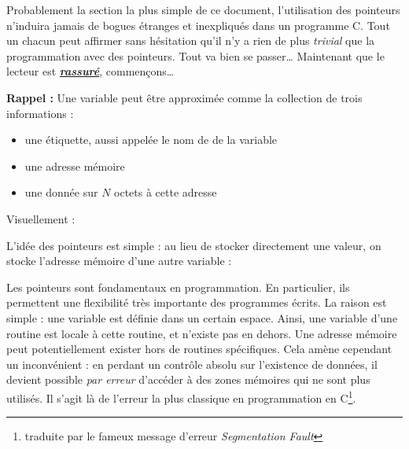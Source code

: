 \documentclass[../../../main.tex]{subfiles}
\begin{document}
Probablement la section la plus simple de ce document, l'utilisation des pointeurs n'induira jamais de bogues étranges et inexpliqués dans un programme C. Tout un chacun peut affirmer sans hésitation qu'il n'y a rien de plus \textit{trivial} que la programmation avec des pointeurs.\newline
Tout va bien se passer\dots\newline
Maintenant que le lecteur est \textbf{\underline{\textit{rassuré}}}, commençons\dots
 
\textbf{Rappel :} Une variable peut être approximée comme la collection de trois informations :
\begin{itemize}
	\item une étiquette, aussi appelée le nom de de la variable
	\item une adresse mémoire
	\item une donnée sur $N$ octets à cette adresse
\end{itemize}
Visuellement : 

\begin{minipage}{\textwidth}
	\begin{center}
		
	\end{center}
\end{minipage} 

L'idée des pointeurs est simple : au lieu de stocker directement une valeur, on stocke l'adresse mémoire d'une autre variable :
 
\begin{minipage}{\textwidth}
	\begin{center}
		
	\end{center}
\end{minipage}
 
Les pointeurs sont fondamentaux en programmation. En particulier, ils permettent une flexibilité très importante des programmes écrits. La raison est simple : une variable est définie dans un certain espace. Ainsi, une variable d'une routine est locale à cette routine, et n'existe pas en dehors. Une adresse mémoire peut potentiellement exister hors de routines spécifiques. Cela amène cependant un inconvénient : en perdant un contrôle absolu sur l'existence de données, il devient possible \textit{par erreur} d'accéder à des zones mémoires qui ne sont plus utilisés. Il s'agit là de l'erreur la plus classique en programmation en C\footnote{traduite par le fameux message d'erreur \textit{Segmentation Fault}}.
 
\end{document}
